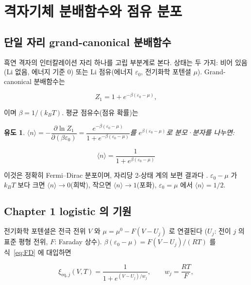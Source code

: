 \documentclass[11pt,a4paper]{article}
\newtheorem*{derivebox}{유도}
\newcommand{\eq}{\mathrm{eq}}
\begin{document}
\section{격자기체 분배함수와 점유 분포}\label{sec:partition}

\subsection{단일 자리 grand-canonical 분배함수}

흑연 격자의 인터칼레이션 자리 하나를 고립 부분계로 본다.
상태는 두 가지: 비어 있음(Li 없음, 에너지 기준 $0$) 또는 Li 점유(에너지 $\varepsilon_0$, 전기화학
포텐셜 $\mu$). Grand-canonical 분배함수는

\begin{equation}
  Z_1 = 1 + e^{-\beta(\varepsilon_0 - \mu)},
  \label{eq:Z1}
\end{equation}

이며 $\beta = 1/(k_B T)$. 평균 점유수(점유 확률)는

\begin{derivebox}
$\langle n \rangle = -\dfrac{\partial \ln Z_1}{\partial(\beta\varepsilon_0)}
= \dfrac{e^{-\beta(\varepsilon_0-\mu)}}{1+e^{-\beta(\varepsilon_0-\mu)}}$를
$e^{\beta(\varepsilon_0-\mu)}$로 분모·분자를 나누면:
\end{derivebox}

\begin{equation}
  \boxed{\;
    \langle n \rangle = \frac{1}{1 + e^{\beta(\varepsilon_0 - \mu)}}
  \;}
  \label{eq:FD}
\end{equation}

이것은 정확히 Fermi--Dirac 분포이며, 자리당 2-상태 계의 보편 결과다 \cite{newman}.
$\varepsilon_0 - \mu$ 가 $k_BT$ 보다 크면 $\langle n \rangle \to 0$(희박),
작으면 $\langle n \rangle \to 1$(포화), $\varepsilon_0 = \mu$ 에서 $\langle n \rangle = 1/2$.

\subsection{Chapter 1 logistic 의 기원}

전기화학 포텐셜은 전극 전위 $V$ 와 $\mu = \mu^0 - F(V - U_j)$ 로 연결된다
($U_j$: 전이 $j$ 의 표준 평형 전위, $F$: Faraday 상수).
$\beta(\varepsilon_0 - \mu) = F(V-U_j)/(RT)$ 를 식~\eqref{eq:FD} 에 대입하면

\begin{equation}
  \xi_{\eq,j}(V,T) = \frac{1}{1 + e^{(V-U_j)/w_j}},
  \qquad w_j = \frac{RT}{F},
  \label{eq:logistic}
\end{equation}
\end{document}
